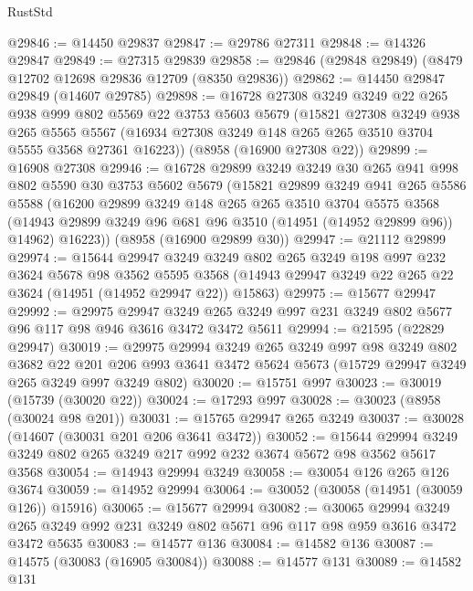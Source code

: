 \begin{lexlean}{RustStd}
\begin{coremodule}
@29846 := @14450 @29837
@29847 := @29786 @27311
@29848 := @14326 @29847
@29849 := @27315 @29839
@29858 := @29846 (@29848 @29849) (@8479 @12702 @12698 @29836 @12709 (@8350 @29836))
@29862 := @14450 @29847 @29849 (@14607 @29785)
@29898 := @16728
    @27308
    @3249
    @3249
    @22
    @265
    @938
    @999
    @802
    @5569
    @22
    @3753
    @5603
    @5679
    (@15821
      @27308
      @3249
      @938
      @265
      @5565
      @5567
      (@16934 @27308 @3249 @148 @265 @265 @3510 @3704 @5555 @3568 @27361 @16223))
    (@8958 (@16900 @27308 @22))
@29899 := @16908 @27308
@29946 := @16728
    @29899
    @3249
    @3249
    @30
    @265
    @941
    @998
    @802
    @5590
    @30
    @3753
    @5602
    @5679
    (@15821
      @29899
      @3249
      @941
      @265
      @5586
      @5588
      (@16200
        @29899
        @3249
        @148
        @265
        @265
        @3510
        @3704
        @5575
        @3568
        (@14943 @29899 @3249 @96 @681 @96 @3510 (@14951 (@14952 @29899 @96)) @14962)
        @16223))
    (@8958 (@16900 @29899 @30))
@29947 := @21112 @29899
@29974 := @15644
    @29947
    @3249
    @3249
    @802
    @265
    @3249
    @198
    @997
    @232
    @3624
    @5678
    @98
    @3562
    @5595
    @3568
    (@14943 @29947 @3249 @22 @265 @22 @3624 (@14951 (@14952 @29947 @22)) @15863)
@29975 := @15677 @29947
@29992 := @29975
    @29947
    @3249
    @265
    @3249
    @997
    @231
    @3249
    @802
    @5677
    @96
    @117
    @98
    @946
    @3616
    @3472
    @3472
    @5611
@29994 := @21595 (@22829 @29947)
@30019 := @29975
    @29994
    @3249
    @265
    @3249
    @997
    @98
    @3249
    @802
    @3682
    @22
    @201
    @206
    @993
    @3641
    @3472
    @5624
    @5673
    (@15729 @29947 @3249 @265 @3249 @997 @3249 @802)
@30020 := @15751 @997
@30023 := @30019 (@15739 (@30020 @22))
@30024 := @17293 @997
@30028 := @30023 (@8958 (@30024 @98 @201))
@30031 := @15765 @29947 @265 @3249
@30037 := @30028 (@14607 (@30031 @201 @206 @3641 @3472))
@30052 := @15644 @29994 @3249 @3249 @802 @265 @3249 @217 @992 @232 @3674 @5672 @98 @3562 @5617 @3568
@30054 := @14943 @29994 @3249
@30058 := @30054 @126 @265 @126 @3674
@30059 := @14952 @29994
@30064 := @30052 (@30058 (@14951 (@30059 @126)) @15916)
@30065 := @15677 @29994
@30082 := @30065
    @29994
    @3249
    @265
    @3249
    @992
    @231
    @3249
    @802
    @5671
    @96
    @117
    @98
    @959
    @3616
    @3472
    @3472
    @5635
@30083 := @14577 @136
@30084 := @14582 @136
@30087 := @14575 (@30083 (@16905 @30084))
@30088 := @14577 @131
@30089 := @14582 @131

\end{coremodule}
\end{lexlean}
